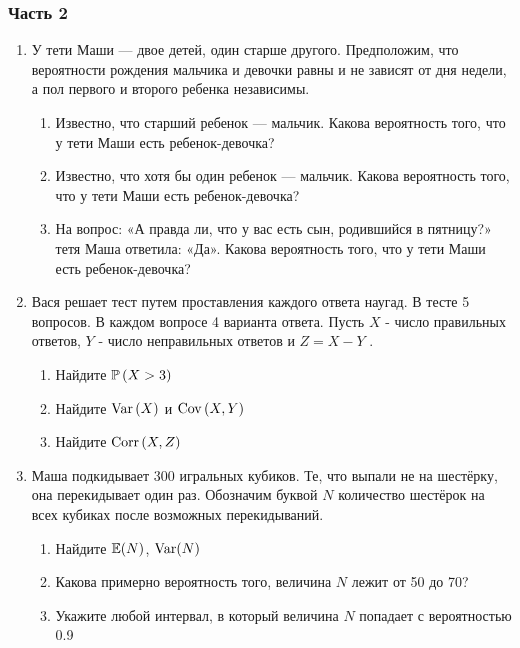 \subsubsection*{Часть 2}

\begin{enumerate}

\item У тети Маши — двое детей, один старше другого. Предположим, что вероятности рождения мальчика и девочки равны и не зависят от дня недели, а пол первого и второго ребенка независимы.
\begin{enumerate}
\item Известно, что старший ребенок — мальчик. Какова
вероятность того, что у тети Маши есть ребенок-девочка?
\item Известно, что хотя бы один ребенок — мальчик. Какова
вероятность того, что у тети Маши есть ребенок-девочка?
\item На вопрос: «А правда ли, что у вас есть сын, родившийся в пятницу?» тетя Маша ответила: «Да». Какова
вероятность того, что у тети Маши есть ребенок-девочка?
\end{enumerate}


\item Вася решает тест путем проставления каждого ответа наугад. В тесте 5 вопросов. В каждом вопросе 4 варианта ответа. Пусть  $X$  - число правильных ответов,  $Y$  - число неправильных ответов и  $Z=X-Y$ .

\begin{enumerate}
\item Найдите  $\P\left(X>3\right)$

\item Найдите  $\Var\left(X\right)$  и  $\Cov\left(X,Y\right)$

\item Найдите  $\Corr\left(X,Z\right)$
\end{enumerate}


\item Маша подкидывает 300 игральных кубиков. Те, что выпали не на шестёрку, она перекидывает один раз. Обозначим буквой $N$ количество шестёрок на всех кубиках после возможных перекидываний.
\begin{enumerate}
\item Найдите $\E(N)$, $\Var(N)$
\item Какова примерно вероятность того, величина $N$ лежит от 50 до 70?
\item Укажите любой интервал, в который величина $N$ попадает с вероятностью 0.9
\end{enumerate}

\end{enumerate}

